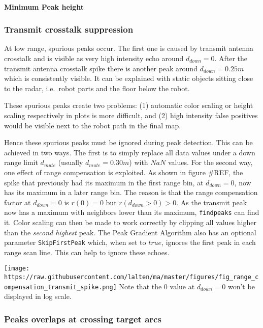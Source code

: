 \paragraph{Minimum Peak height}\label{minimum-peak-height}

\subsubsection{Transmit crosstalk
suppression}\label{transmit-crosstalk-suppression}

At low range, spurious peaks occur. The first one is caused by transmit
antenna crosstalk and is visible as very high intensity echo around
\(d_{down}=0\). After the transmit antenna crosstalk spike there is
another peak around \(d_{down}=0.25m\) which is consistently visible. It
can be explained with static objects sitting close to the radar,
i.e.~robot parts and the floor below the robot.

These spurious peaks create two problems: (1) automatic color scaling or
height scaling respectively in plots is more difficult, and (2) high
intensity false positives would be visible next to the robot path in the
final map.

Hence these spurious peaks must be ignored during peak detection. This
can be achieved in two ways. The first is to simply replace all data
values under a down range limit \(d_{mute}\) (usually
\(d_{mute}=0.30m\)) with \(NaN\) values. For the second way, one effect
of range compensation is exploited. As shown in figure \#REF, the spike
that previously had its maximum in the first range bin, at
\(d_{down}=0\), now has its maximum in a later range bin. The reason is
that the range compensation factor at \(d_{down}=0\) is \(r(0) = 0\) but
\(r(d_{down}>0) > 0\). As the transmit peak now has a maximum with
neighbors lower than its maximum, \texttt{findpeaks} can find it. Color
scaling can then be made to work correctly by clipping all values higher
than the \emph{second highest} peak. The Peak Gradient Algorithm also
has an optional parameter \texttt{SkipFirstPeak} which, when set to
\(true\), ignores the first peak in each range scan line. This can help
to ignore these echoes.

\texttt{[image: https://raw.githubusercontent.com/lalten/ma/master/figures/fig\_range\_compensation\_transmit\_spike.png]}
Note that the \(0\) value at \(d_{down}=0\) won't be displayed in log
scale.

\subsubsection{Peaks overlaps at crossing target
arcs}\label{peaks-overlaps-at-crossing-target-arcs}

